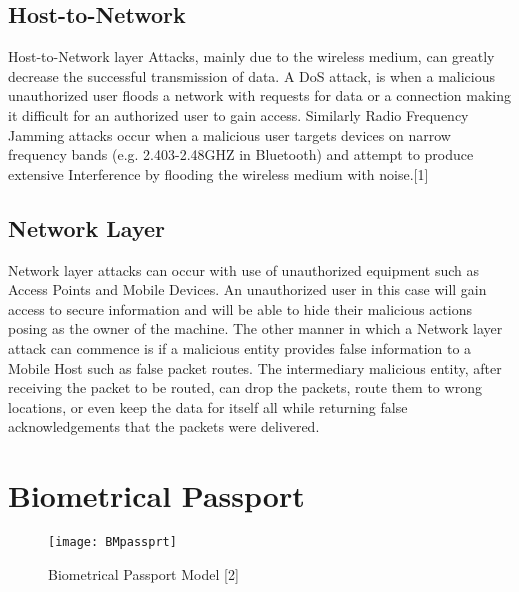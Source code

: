 \documentclass[11pt,onecolumn,cspaper,compsoc]{IEEEtran}
\begin{document}
\subsection*{Host-to-Network}

Host-to-Network layer Attacks, mainly due to the wireless medium, can greatly decrease the successful transmission of data. A DoS attack, is when 
a malicious unauthorized user floods a network with requests for data or a connection making it difficult for an authorized user to gain 
access. Similarly Radio Frequency Jamming attacks occur when a malicious user targets devices on narrow frequency bands (e.g. 2.403-2.48GHZ in 
Bluetooth) and attempt to produce extensive Interference by flooding the wireless medium with noise.[1]

\subsection*{Network Layer}

Network layer attacks can occur with use of unauthorized equipment such as Access Points and Mobile Devices. An unauthorized user in this case 
will gain access to secure information and will be able to hide their malicious actions posing as the owner of the machine. The other manner 
in which a Network layer attack can commence is if a malicious entity provides false information to a Mobile Host such as false packet routes. 
The intermediary malicious entity, after receiving the packet to be routed, can drop the packets, route them to wrong locations, or even keep 
the data for itself all while returning false acknowledgements that the packets were delivered. 


\section{Biometrical Passport}

\begin{figure}[!t]
  \centering
  \texttt{[image: BMpassprt]}
  \caption{Biometrical Passport Model [2]}
  \label{BMP}
\end{figure}
\end{document}
